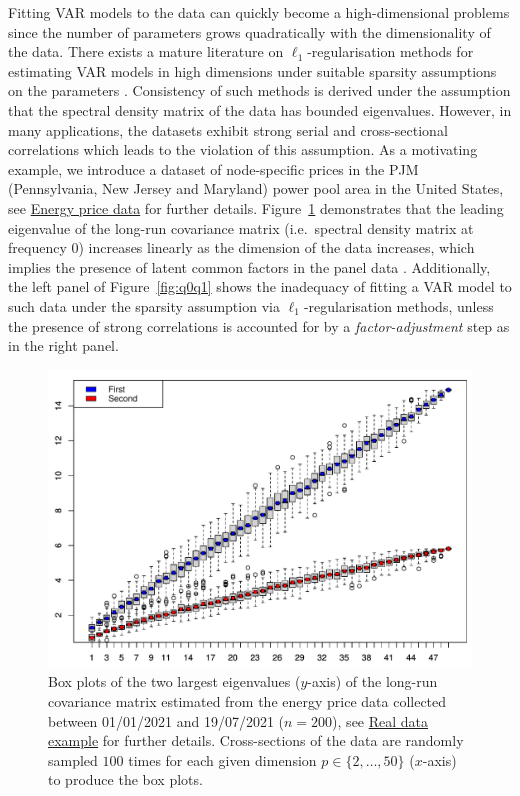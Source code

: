 Fitting VAR models to the data can quickly become a high-dimensional problems since the number of parameters grows quadratically with the dimensionality of the data.
There exists a mature literature on $\ell_1$-regularisation methods for estimating VAR models in high dimensions under suitable sparsity assumptions on the parameters
\citep{basu2015regularized, han2015direct, kock2015oracle, medeiros2016, nicholson2020high, liu2021robust}.
Consistency of such methods is derived under the assumption that the spectral density matrix of the data has bounded eigenvalues.
However, in many applications, the datasets exhibit strong serial and cross-sectional correlations which leads to the violation of this assumption.
As a motivating example, we introduce a dataset of node-specific prices in the PJM (Pennsylvania, New Jersey and Maryland) power pool area in the United States, see \hyperref[sec:real:energy]{Energy price data} for further details.
Figure~\ref{fig:eigen} demonstrates that the leading eigenvalue of the long-run covariance matrix (i.e.\ spectral density matrix at frequency $0$) increases linearly as the dimension of the data increases, which implies the presence of latent common factors in the panel data \citep{forni2000generalized}.
Additionally, the left panel of Figure~\ref{fig:q0q1} shows the inadequacy of fitting a VAR model to such data under the sparsity assumption via $\ell_1$-regularisation methods, unless the presence of strong correlations is accounted for by a {\it factor-adjustment} step as in the right panel.

\begin{figure}[htb!]
\centering
\includegraphics[width = .6\textwidth]{figs/eigplot.pdf}
\caption{Box plots of the two largest eigenvalues ($y$-axis) of the long-run covariance matrix estimated from the energy price data collected between 01/01/2021 and 19/07/2021 ($n = 200$), see \hyperref[sec:real]{Real data example} for further details.
Cross-sections of the data are randomly sampled $100$ times for each given dimension $p \in \{2, \dots, 50\}$ ($x$-axis) to produce the box plots.}
\label{fig:eigen}
\end{figure}

